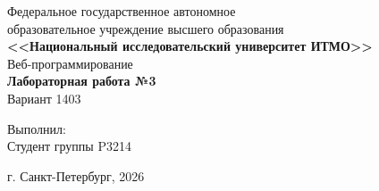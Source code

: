 \begin{titlepage}
    \centering
    Федеральное государственное автономное \\
    образовательное учреждение высшего образования \\
    \textbf{<<Национальный исследовательский университет ИТМО>>} \\

    \vfill
    Веб-программирование \\
    \vspace{0.5\baselineskip}
    \textbf{Лабораторная работа №3} \\
    \vspace{0.5\baselineskip}
    Вариант 1403 \\

    \vfill

    \flushright
    Выполнил: \\
    Студент группы P3214 \\

    \vspace{4\baselineskip}

    \centering
    г. Санкт-Петербург, 2026

\end{titlepage}
